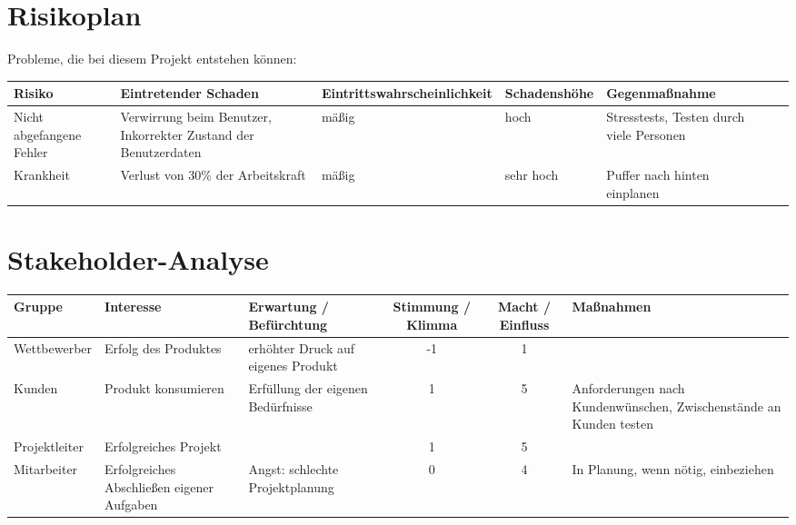 %
%	

\begin{landscape}
\begin{center}
\section{Risikoplan}
Probleme, die bei diesem Projekt entstehen können:

\begin{tabulary}{1.35\textwidth}{|L|L|L|L|L|L|L|}
\hline 
\textbf{Risiko} & \textbf{Eintretender Schaden} & \textbf{Eintrittswahrscheinlichkeit} & \textbf{Schadenshöhe} & \textbf{Gegenmaßnahme} \\ 
\hline 
Nicht abgefangene Fehler & Verwirrung beim Benutzer, Inkorrekter Zustand der Benutzerdaten & mäßig & hoch & Stresstests, Testen durch viele Personen\\ 
\hline
Krankheit & Verlust von 30\% der Arbeitskraft & mäßig & sehr hoch & Puffer nach hinten einplanen \\ 
\hline
\end{tabulary}

\bigskip
\section{Stakeholder-Analyse}
\begin{tabulary}{1.35\textwidth}{|L|L|L|C|C|L|}
\hline 
\textbf{Gruppe} & \textbf{Interesse} & \textbf{Erwartung / Befürchtung} & \textbf{Stimmung / Klimma} & \textbf{Macht / Einfluss} & \textbf{Maßnahmen} \\ 
\hline 
Wettbewerber & Erfolg des Produktes & erhöhter Druck auf eigenes Produkt & -1 & 1 & \\ 
\hline 
Kunden & Produkt konsumieren & Erfüllung der eigenen Bedürfnisse & 1 & 5 & Anforderungen nach Kundenwünschen, Zwischenstände an Kunden testen \\ 
\hline 
Projektleiter & Erfolgreiches Projekt &  & 1 & 5 & \\ 
\hline 
Mitarbeiter & Erfolgreiches Abschließen eigener Aufgaben & Angst: schlechte Projektplanung & 0 & 4 & In Planung, wenn nötig, einbeziehen \\ 
\hline
\end{tabulary} 
 
\end{center}


\end{landscape}
\restoregeometry